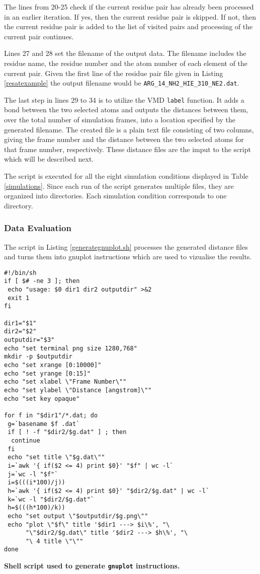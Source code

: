 \documentclass[11pt,twocolumn]{article}
\begin{document}
The lines from 20-25 check if the current residue pair has already been
processed in an earlier iteration. If yes, then the current residue pair is
skipped. If not, then the current residue pair is added to the list of visited
pairs and processing of the current pair continues.  

Lines 27 and 28 set the filename of the output data. The filename includes the
residue name, the residue number and the atom number of each element of the
current pair. Given the first line of the residue pair file given in Listing
\ref{resatexample} the output filename would be
\texttt{ARG\_14\_NH2\_HIE\_310\_NE2.dat}.

The last step in lines 29 to 34 is to utilize the VMD \texttt{label} function.
It adds a bond between the two selected atoms and outputs the distances between
them, over the total number of simulation frames, into a location specified by
the generated filename. The created file is a plain text file consisting of two
columns, giving the frame number and the distance between the two selected
atoms for that frame number, respectively. These distance files are the imput
to the script which will be described next.

The script is executed for all the eight simulation conditions displayed in
Table \ref{simulations}. Since each run of the script generates multiple files,
they are organized into directories. Each simulation condition corresponds to
one directory.

\subsubsection*{Data Evaluation}

The script in Listing \ref{generategnuplot.sh} processes the generated distance
files and turns them into gnuplot instructions which are used to vizualise the
results.

\begin{listing}
\begin{verbatim}
#!/bin/sh
if [ $# -ne 3 ]; then 
 echo "usage: $0 dir1 dir2 outputdir" >&2
 exit 1
fi

dir1="$1"
dir2="$2"
outputdir="$3"
echo "set terminal png size 1280,768" 
mkdir -p $outputdir
echo "set xrange [0:10000]"
echo "set yrange [0:15]"
echo "set xlabel \"Frame Number\""
echo "set ylabel \"Distance [angstrom]\""
echo "set key opaque"

for f in "$dir1"/*.dat; do
 g=`basename $f .dat`
 if [ ! -f "$dir2/$g.dat" ] ; then 
  continue
 fi
 echo "set title \"$g.dat\""
 i=`awk '{ if($2 <= 4) print $0}' "$f" | wc -l`
 j=`wc -l "$f"`
 i=$(((i*100)/j))
 h=`awk '{ if($2 <= 4) print $0}' "$dir2/$g.dat" | wc -l`
 k=`wc -l "$dir2/$g.dat"`
 h=$(((h*100)/k))
 echo "set output \"$outputdir/$g.png\""
 echo "plot \"$f\" title '$dir1 ---> $i\%', "\
      "\"$dir2/$g.dat\" title '$dir2 ---> $h\%', "\
      "\ 4 title \"\""
done
\end{verbatim}
\caption{\textbf{Shell script used to generate \texttt{gnuplot} instructions.}}\label{generategnuplot.sh}
\end{listing}
\end{document}
